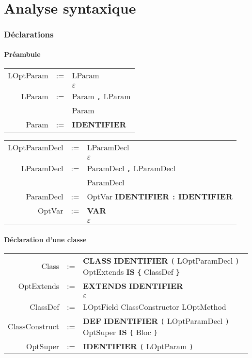 \documentclass[12pt,a4paper]{article}
\begin{document}
\newpage

\part{Analyse syntaxique}

\section{Déclarations}

\subsection{Préambule}

\begin{multicols}{2}
	\sffamily
	\begin{tabular}{rcl}
		LOptParam & := & LParam                \tabularnewline
		    & \textbar & $\varepsilon$         \tabularnewline
		LParam    & := & Param \verb|,| LParam \tabularnewline
		    & \textbar & Param                 \tabularnewline
		Param     & := & \textbf{IDENTIFIER}   \tabularnewline
	\end{tabular}
	\begin{tabular}{rcl}
		LOptParamDecl & := & LParamDecl                    \tabularnewline
		        & \textbar & $\varepsilon$                 \tabularnewline
		LParamDecl    & := & ParamDecl \verb|,| LParamDecl \tabularnewline
		        & \textbar & ParamDecl                     \tabularnewline
		ParamDecl     & := & OptVar \textbf{IDENTIFIER} \verb|:| \textbf{IDENTIFIER} \tabularnewline
		OptVar        & := & \textbf{VAR}                  \tabularnewline
		        & \textbar & $\varepsilon$                 \tabularnewline
	\end{tabular}
\end{multicols}

\subsection{Déclaration d'une classe}

\begin{center}
	\sffamily
	\begin{tabular}{rcl}
		Class          & := & \textbf{CLASS} \textbf{IDENTIFIER} \verb|(| LOptParamDecl \verb|)| OptExtends \textbf{IS} \verb|{| ClassDef \verb|}| \tabularnewline
		OptExtends     & := & \textbf{EXTENDS} \textbf{IDENTIFIER}  \tabularnewline
		         & \textbar & $\varepsilon$                         \tabularnewline    
		ClassDef       & := & LOptField ClassConstructor LOptMethod \tabularnewline		
		ClassConstruct & := & \textbf{DEF} \textbf{IDENTIFIER} \verb|(| LOptParamDecl \verb|)| OptSuper \textbf{IS} \verb|{| Bloc \verb|}| \tabularnewline
        OptSuper       & := & \textbf{IDENTIFIER} \verb|(| LOptParam \verb|)|
	\end{tabular}
\end{center}
\end{document}
